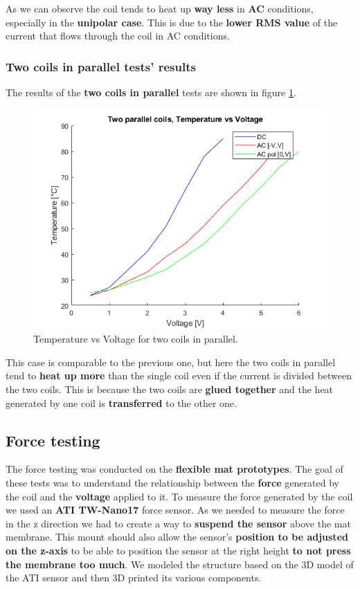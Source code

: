 As we can observe the coil tends to heat up \textbf{way less} in \textbf{AC} conditions, especially in the \textbf{unipolar case}.
This is due to the \textbf{lower RMS value} of the current that flows through the coil in AC conditions.

\subsubsection{Two coils in parallel tests' results}
\begin{samepage}
    The results of the \textbf{two coils in parallel} tests are shown in figure \ref{fig: Two_coils_heating_tests}.
    \nopagebreak

    \begin{figure}[H]
        \centering
        \includegraphics[width = 0.7\linewidth]{Chapters/Chapter5/Exp_Evaluation/Figures/Temp_vs_Volt_2_coils.png}
        \caption{Temperature vs Voltage for two coils in parallel.}
        \label{fig: Two_coils_heating_tests}
    \end{figure}
\end{samepage}

This case is comparable to the previous one, but here the two coils in parallel tend to \textbf{heat up more} than the single coil even if the current is divided between the two coils.
This is because the two coils are \textbf{glued together} and the heat generated by one coil is \textbf{transferred} to the other one.

\subsection{Force testing}
The force testing was conducted on the \textbf{flexible mat prototypes}.
The goal of these tests was to understand the relationship between the \textbf{force} generated by the coil and the \textbf{voltage} applied to it.
To measure the force generated by the coil we used an \textbf{ATI TW-Nano17} force sensor.
As we needed to measure the force in the z direction we had to create a way to \textbf{suspend the sensor} above the mat membrane.
This mount should also allow the sensor's \textbf{position to be adjusted on the z-axis} to be able to position the sensor at the right height \textbf{to not press the membrane too much}.
We modeled the structure based on the 3D model of the ATI sensor and then 3D printed its various components.

